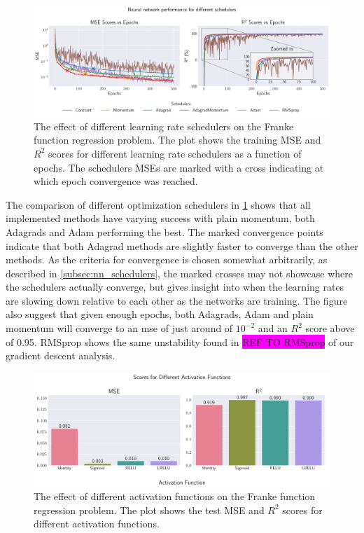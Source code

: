 \onecolumngrid
\begin{figure}[h!]
    \begin{minipage}{\textwidth}
        \centering
        \includegraphics[width = .9\textwidth]{../figs/b_schedulers.pdf}
        \caption{The effect of different learning rate schedulers on the Franke function regression problem. The plot shows the training MSE and \( R^2 \) scores for different learning rate schedulers as a function of epochs. The schedulers MSEs are marked with a cross indicating at which epoch convergence was reached.}
        \label{fig:NN_Franke_schedulers}
    \end{minipage}
\end{figure}
\twocolumngrid

The comparison of different optimization schedulers in \cref{fig:NN_Franke_schedulers} shows that all implemented methods have varying success with plain momentum, both Adagrads and Adam performing the best. The marked convergence points indicate that both Adagrad methods are slightly faster to converge than the other methods. As the criteria for convergence is chosen somewhat arbitrarily, as described in \cref{subsec:nn_schedulers}, the marked crosses may not showcase where the schedulers actually converge, but gives insight into when the learning rates are slowing down relative to each other as the networks are training. The figure also suggest that given enough epochs, both Adagrads, Adam and plain momentum will converge to an mse of just around of \( 10^{-2} \) and an \( R^2 \) score above of 0.95. RMSprop shows the same unstability found in \colorbox{magenta}{REF TO RMSprop} of our gradient descent analysis.

\clearpage

\onecolumngrid
\begin{figure}[h!]
    \begin{minipage}{\textwidth}
        \centering
        \includegraphics[width = .9\textwidth]{../figs/c_activation_funcs.pdf}
        \caption{The effect of different activation functions on the Franke function regression problem. The plot shows the test MSE and \( R^2 \) scores for different activation functions.}
        \label{fig:NN_Franke_activation}
    \end{minipage}
\end{figure}
\twocolumngrid

